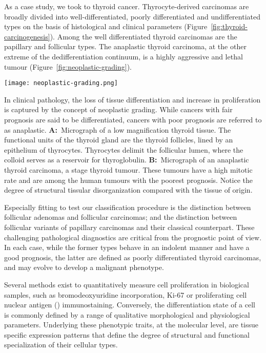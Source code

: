 As a case study, we took to thyroid cancer.  Thyrocyte-derived carcinomas are
broadly divided into well-differentiated, poorly differentiated and
undifferentiated types on the basis of histological and clinical parameters
(Figure~\ref{fig:thyroid-carcinogenesis}).\cite{kondo_pathogenetic_2006} Among
the well differentiated thyroid carcinomas are the papillary and follicular
types.  The anaplastic thyroid carcinoma, at the other extreme of the
dedifferentiation continuum, is a highly aggressive and lethal tumour
(Figure~\ref{fig:neoplastic-grading}).

\begin{marginfigure}
  \begin{center}
    \texttt{[image: neoplastic-grading.png]}
    \caption[Neoplastic grading]{In clinical pathology, the loss of tissue
      differentiation and increase in proliferation is captured by the concept
      of neoplastic grading.  While cancers with fair prognosis are said to be
      differentiated, cancers with poor prognosis are referred to as anaplastic.
      \textbf{A:}~Micrograph of a low magnification thyroid tissue.  The
      functional units of the thyroid gland are the thyroid follicles, lined by
      an epithelium of thyrocytes.  Thyrocytes delimit the follicular lumen,
      where the colloid serves as a reservoir for thyroglobulin.
      \textbf{B:}~Micrograph of an anaplastic thyroid carcinoma, a stage
       thyroid tumour.  These tumours have a high mitotic rate and
      are among the human tumours with the poorest prognosis.  Notice the degree
      of structural tissular disorganization compared with the tissue of
      origin.}
    \label{fig:neoplastic-grading}%
  \end{center}
\end{marginfigure}

Especially fitting to test our classification procedure is the distinction
between follicular adenomas and follicular carcinomas; and the distinction
between follicular variants of papillary carcinomas and their classical
counterpart.  These challenging pathological
diagnostics\cite{lubitz_molecular_2005} are critical from the prognostic point
of view.  In each case, while the former types behave in an indolent manner and
have a good prognosis, the latter are defined as poorly differentiated thyroid
carcinomas, and may evolve to develop a malignant phenotype.

Several methods exist to quantitatively measure cell proliferation in biological
samples, such as bromodeoxyuridine incorporation, Ki-67 or proliferating cell
nuclear antigen () immunostaining.  Conversely, the
differentiation state of a cell is commonly defined by a range of qualitative
morphological and physiological parameters.  Underlying these phenotypic traits,
at the molecular level, are tissue specific expression patterns that define the
degree of structural and functional specialization of their cellular types.


